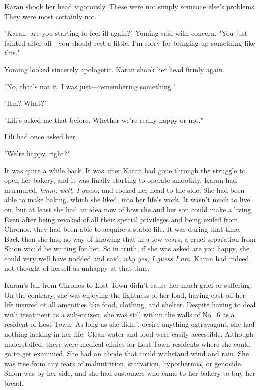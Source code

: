 Karan shook her head vigorously. These were not simply someone else's
problems. They were most certainly not.

"Karan, are you starting to feel ill again?" Yoming said with concern.
"You just fainted after all---you should rest a little. I'm sorry for
bringing up something like this."

Yoming looked sincerely apologetic. Karan shook her head firmly again.

"No, that's not it. I was just---remembering something."

"Hm? What?"

"Lili's asked me that before. Whether we're really happy or not."

Lili had once asked her.

"We're happy, right?"

It was quite a while back. It was after Karan had gone through the
struggle to open her bakery, and it was finally starting to operate
smoothly. Karan had murmured, \emph{hmm, well, I guess}, and cocked her head to
the side. She had been able to make baking, which she liked, into her
life's work. It wasn't much to live on, but at least she had an idea now
of how she and her son could make a living. Even after being revoked of
all their special privileges and being exiled from Chronos, they had
been able to acquire a stable life. It was during that time. Back then
she had no way of knowing that in a few years, a cruel separation from
Shion would be waiting for her. So in truth, if she was asked are you
happy, she could very well have nodded and said, \emph{why yes, I guess I am}.
Karan had indeed not thought of herself as unhappy at that time.

Karan's fall from Chronos to Lost Town didn't cause her much grief or
suffering. On the contrary, she was enjoying the lightness of her load,
having cast off her life insured of all amenities like food, clothing,
and shelter. Despite having to deal with treatment as a sub-citizen, she
was still within the walls of No.~6 as a resident of Lost Town. As long
as she didn't desire anything extravagant, she had nothing lacking in
her life. Clean water and food were easily accessible. Although
understaffed, there were medical clinics for Lost Town residents where
she could go to get examined. She had an abode that could withstand wind
and rain. She was free from any fears of malnutrition, starvation,
hypothermia, or genocide. Shion was by her side, and she had customers
who came to her bakery to buy her bread.

